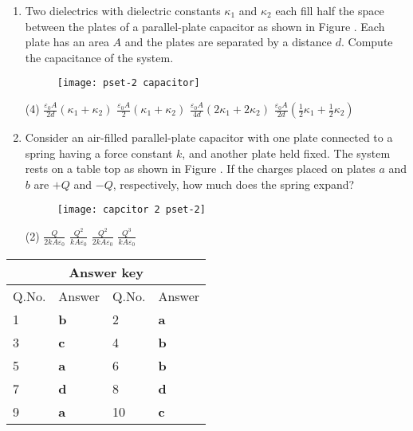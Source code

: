\begin{enumerate} [label=\color{ocre}\textbf{\arabic*.}]
 \item  Two dielectrics with dielectric constants $\kappa_{1}$ and $\kappa_{2}$ each fill half the space between the plates of a parallel-plate capacitor as shown in Figure . Each plate has an area $A$ and the plates are separated by a distance $d$. Compute the capacitance of the system.
 \begin{figure}[H]
 	\centering
 	\texttt{[image: pset-2 capacitor]}
 	\label{pset-2 capacitor}
 \end{figure}
  \begin{tasks}(4)
 	\task[\textbf{a.}]$\frac{\varepsilon_{0} A}{2 d}\left(\kappa_{1}+\kappa_{2}\right)$
 	\task[\textbf{b.}]$\frac{\varepsilon_{0} A}{2 }\left(\kappa_{1}+\kappa_{2}\right) $
 	\task[\textbf{c.}]$\frac{\varepsilon_{0} A}{4 d}\left(2\kappa_{1}+2\kappa_{2}\right) $
 	\task[\textbf{d.}]$\frac{\varepsilon_{0} A}{2 d}\left(\frac{1}{2}\kappa_{1}+\frac{1}{2}\kappa_{2}\right) $
 \end{tasks} 
\item Consider an air-filled parallel-plate capacitor with one plate connected to a spring having a force constant $k$, and another plate held fixed. The system rests on a table top as shown in Figure . If the charges placed on plates $a$ and $b$ are $+Q$ and $-Q$, respectively, how much does the spring expand?
\begin{figure}[H]
	\centering
	\texttt{[image: capcitor 2 pset-2]}
	\label{capcitor 2 pset-2}
\end{figure}
\begin{tasks}(2)
	\task[\textbf{a.}]  $\frac{Q}{2 k A \varepsilon_{0}}$
	\task[\textbf{b.}]  $\frac{Q^{2}}{k A \varepsilon_{0}}$
	\task[\textbf{c.}]  $\frac{Q^{2}}{2 k A \varepsilon_{0}}$
	\task[\textbf{d.}]  $\frac{Q^{3}}{ k A \varepsilon_{0}}$
\end{tasks}
\end{enumerate}
\setlength\arrayrulewidth{1pt}
\begin{table}[H]
	\centering
	\begin{tabular}{|p{1.5cm}|p{1.5cm}||p{1.5cm}|p{1.5cm}|}
		\hline
		\multicolumn{4}{|c|}{\textbf{Answer key}}\\\hline\hline
		\rowcolor{ocrel}Q.No.&Answer&Q.No.&Answer\\\hline
		1&\textbf{b} &2&\textbf{a}\\\hline 
		3&\textbf{c} &4&\textbf{b} \\\hline
		5&\textbf{a} &6&\textbf{b} \\\hline
		7&\textbf{d}&8&\textbf{d}\\\hline
		9&\textbf{a}&10&\textbf{c}\\\hline
		
		
	\end{tabular}
\end{table}

